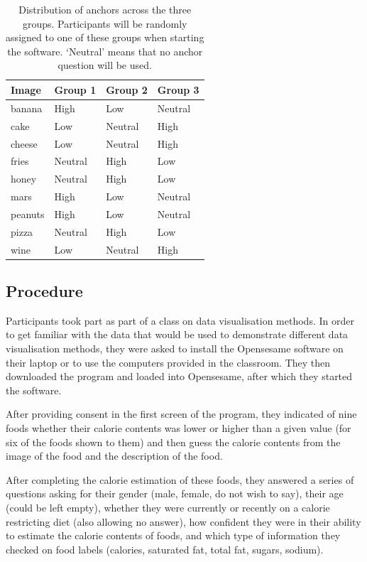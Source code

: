 \documentclass[a4paper,doc,natbib]{apa6}
\begin{document}
\begin{table}[!h]
  \caption{Distribution of anchors across the three groups. Participants will be randomly assigned to one of these groups when starting the software. `Neutral' means that no anchor question will be used.} 
  \label{tab:design} 
\begin{tabular}{p{5cm}p{3cm}p{3cm}p{3cm}}  
\hline 
Image & Group 1 & Group 2 & Group 3 \\ 
\hline
banana & High & Low & Neutral \\ 
cake & Low & Neutral & High \\ 
cheese & Low & Neutral & High \\ 
fries & Neutral & High & Low \\ 
honey & Neutral & High & Low \\ 
mars & High & Low & Neutral \\ 
peanuts & High & Low & Neutral \\ 
pizza & Neutral & High & Low \\ 
wine & Low & Neutral & High \\ 
\hline 
\end{tabular} 
\end{table} 

\subsection{Procedure}

Participants took part as part of a class on data visualisation methods. In order to get familiar with the data that would be used to demonstrate different data visualisation methods, they were asked to install the Opensesame software \citep{mathot12} on their laptop or to use the computers provided in the classroom. They then downloaded the program and loaded into Opensesame, after which they started the software.

After providing consent in the first screen of the program, they indicated of nine foods whether their calorie contents was lower or higher than a given value (for six of the foods shown to them) and then guess the calorie contents from the image of the food and the description of the food. 

After completing the calorie estimation of these foods, they answered a series of questions asking for their gender (male, female, do not wish to say), their age (could be left empty), whether they were currently or recently on a calorie restricting diet (also allowing no answer), how confident they were in their ability to estimate the calorie contents of foods, and which type of information they checked on food labels (calories, saturated fat, total fat, sugars, sodium).
\end{document}
